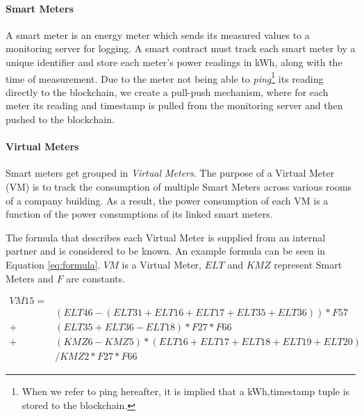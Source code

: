 \paragraph{Smart Meters}

A smart meter is an energy meter which sends its measured values to a monitoring server for logging. A smart contract must track each smart meter by a unique identifier and store each meter's power readings in kWh, along with the time of measurement. Due to the meter not being able to \textit{ping}\footnote{When we refer to ping hereafter, it is implied that a kWh,timestamp tuple is stored to the blockchain.} its reading directly to the blockchain, we create a pull-push mechanism, where for each meter its reading and timestamp is pulled from the monitoring server and then pushed to the blockchain. 



\paragraph{Virtual Meters}

Smart meters get grouped in \textit{Virtual Meters}. The purpose of a Virtual Meter (VM) is to track the consumption of multiple Smart Meters across various rooms of a company building. As a result, the power consumption of each VM is a function of the power consumptions of its linked smart meters. %


The formula that describes each Virtual Meter is supplied from an internal partner and is considered to be known. An example formula can be seen in Equation \ref{eq:formula}. $VM$ is a Virtual Meter, $ELT$ and $KMZ$ represent Smart Meters and $F$ are constants.

\begin{equation} \label{eq:formula}
    \begin{aligned}
        VM15= \\
        & (ELT46-(ELT31+ELT16+ELT17+ELT35+ELT36))*F57
        \\
        + & (ELT35+ELT36-ELT18)*F27*F66
        \\
        + & (KMZ6-KMZ5)*(ELT16+ELT17+ELT18+ELT19+ELT20)\\
        & /KMZ2*F27*F66 
    \end{aligned}
\end{equation}

